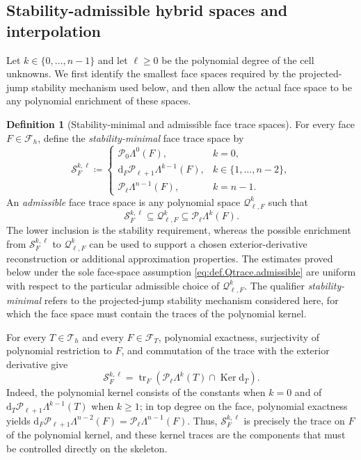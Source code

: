 \documentclass[a4paper,11pt]{article}
\theoremstyle{definition}
\newtheorem{definition}[theorem]{Definition}
\newcommand{\DIFF}{\mathrm{d}}
\newcommand{\PL}[2]{\mathcal{P}_{#1}\Lambda^{#2}}
\newcommand{\Qtrace}[2]{\mathcal Q_{\ell,#1}^{#2}}
\newcommand{\trc}{\operatorname{tr}}
\newcommand{\Ker}{\operatorname{Ker}}
\begin{document}
\subsection{Stability-admissible hybrid spaces and interpolation}
\label{subsec:hybrid.spaces}

Let $k\in\{0,\ldots,n-1\}$ and let $\ell\geq0$ be the polynomial degree of the cell unknowns.
We first identify the smallest face spaces required by the projected-jump stability mechanism used below, and then allow the actual face space to be any polynomial enrichment of these spaces.

\begin{definition}[Stability-minimal and admissible face trace spaces]
\label{def:face.trace.spaces}
For every face $F\in\mathcal F_h$, define the \emph{stability-minimal} face trace space by
\[
  \mathcal S_F^{k,\ell}
  \coloneqq
  \begin{cases}
    \PL{0}{0}(F),
    & k=0,
    \\[1mm]
    \DIFF_F\PL{\ell+1}{k-1}(F),
    & k\in\{1,\ldots,n-2\},
    \\[1mm]
    \PL{\ell}{n-1}(F),
    & k=n-1.
  \end{cases}
\]
An \emph{admissible} face trace space is any polynomial space $\Qtrace{F}{k}$ such that
\begin{equation}\label{eq:def.Qtrace.admissible}
  \mathcal S_F^{k,\ell}
  \subseteq
  \Qtrace{F}{k}
  \subseteq
  \PL{\ell}{k}(F).
\end{equation}
The lower inclusion is the stability requirement, whereas the possible enrichment from $\mathcal S_F^{k,\ell}$ to $\Qtrace{F}{k}$ can be used to support a chosen exterior-derivative reconstruction or additional approximation properties.
The estimates proved below under the sole face-space assumption \eqref{eq:def.Qtrace.admissible} are uniform with respect to the particular admissible choice of $\Qtrace{F}{k}$.
The qualifier \emph{stability-minimal} refers to the projected-jump stability mechanism considered here, for which the face space must contain the traces of the polynomial kernel.
\end{definition}

For every $T\in\mathcal T_h$ and every $F\in\mathcal F_T$, polynomial exactness, surjectivity of polynomial restriction to $F$, and commutation of the trace with the exterior derivative give
\begin{equation}\label{eq:stability.minimal.kernel.trace}
  \mathcal S_F^{k,\ell}
  =
  \trc_F
  \left(
    \PL{\ell}{k}(T)
    \cap
    \Ker\DIFF_T
  \right).
\end{equation}
Indeed, the polynomial kernel consists of the constants when $k=0$ and of $\DIFF_T\PL{\ell+1}{k-1}(T)$ when $k\geq1$; in top degree on the face, polynomial exactness yields $\DIFF_F\PL{\ell+1}{n-2}(F)=\PL{\ell}{n-1}(F)$.
Thus, $\mathcal S_F^{k,\ell}$ is precisely the trace on $F$ of the polynomial kernel, and these kernel traces are the components that must be controlled directly on the skeleton.
\end{document}
